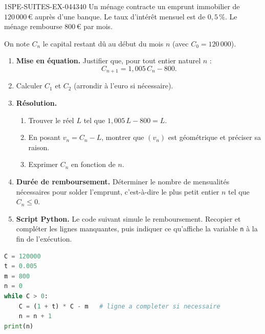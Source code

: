 \begin{exercice}{1SPE-SUITES-EX-044}{3}{40}
Un ménage contracte un emprunt immobilier de $120\,000$\,€ auprès d'une banque. Le taux d'intérêt mensuel est de $0{,}5\,\%$. Le ménage rembourse $800$\,€ par mois.

On note $C_n$ le capital restant dû au début du mois $n$ (avec $C_0 = 120\,000$).

\begin{enumerate}
  \item \textbf{Mise en équation.} Justifier que, pour tout entier naturel $n$ :
  \[
    C_{n+1} = 1{,}005\, C_n - 800.
  \]

  \item Calculer $C_1$ et $C_2$ (arrondir à l'euro si nécessaire).

  \item \textbf{Résolution.}
  \begin{enumerate}
    \item Trouver le réel $L$ tel que $1{,}005\,L - 800 = L$.
    \item En posant $v_n = C_n - L$, montrer que $(v_n)$ est géométrique et préciser sa raison.
    \item Exprimer $C_n$ en fonction de $n$.
  \end{enumerate}

  \item \textbf{Durée de remboursement.} Déterminer le nombre de mensualités nécessaires pour solder l'emprunt, c'est-à-dire le plus petit entier $n$ tel que $C_n \leq 0$.

  \item \textbf{Script Python.} Le code suivant simule le remboursement. Recopier et compléter les lignes manquantes, puis indiquer ce qu'affiche la variable \texttt{n} à la fin de l'exécution.
\end{enumerate}
\end{exercice}

\begin{lstlisting}[language=Python]
C = 120000
t = 0.005
m = 800
n = 0
while C > 0:
    C = (1 + t) * C - m   # ligne a completer si necessaire
    n = n + 1
print(n)
\end{lstlisting}
